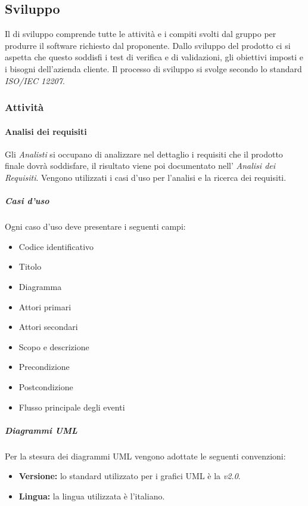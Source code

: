 \subsection{Sviluppo}
Il  di sviluppo comprende tutte le attività e i compiti svolti dal gruppo per produrre il software richiesto dal proponente. Dallo sviluppo del prodotto ci si aspetta che questo soddisfi i test di verifica e di validazioni, gli obiettivi imposti e i bisogni dell'azienda cliente. Il processo di sviluppo si svolge secondo lo standard \textit{ISO/IEC 12207}.

\subsubsection{Attività}

\paragraph{Analisi dei requisiti}
Gli \textit{Analisti} si occupano di analizzare nel dettaglio i requisiti che il prodotto finale dovrà soddisfare, il risultato viene poi documentato nell' \textit{Analisi dei Requisiti}. Vengono utilizzati i casi d'uso per l'analisi e la ricerca dei requisiti.

\subparagraph{Casi d'uso}
Ogni caso d'uso deve presentare i seguenti campi:
\begin{itemize}
	\item Codice identificativo
	\item Titolo
	\item Diagramma 
	\item Attori primari
	\item Attori secondari
	\item Scopo e descrizione
	\item Precondizione
	\item Postcondizione
	\item Flusso principale degli eventi
\end{itemize}

\subparagraph{Diagrammi UML}
Per la stesura dei diagrammi UML vengono adottate le seguenti convenzioni:
\begin{itemize}
	\item \textbf{Versione:} lo standard utilizzato per i grafici UML è la \textit{v2.0}.
	\item \textbf{Lingua:} la lingua utilizzata è l'italiano.
\end{itemize}


